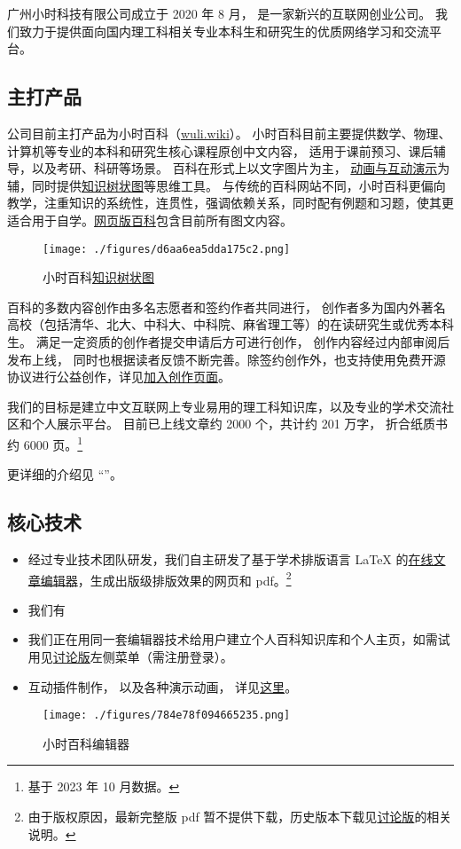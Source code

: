 
广州小时科技有限公司成立于 2020 年 8 月， 是一家新兴的互联网创业公司。 我们致力于提供面向国内理工科相关专业本科生和研究生的优质网络学习和交流平台。

\subsection{主打产品}
公司目前主打产品为小时百科（\href{https://wuli.wiki}{wuli.wiki}）。 小时百科目前主要提供数学、物理、计算机等专业的本科和研究生核心课程原创中文内容， 适用于课前预习、课后辅导，以及考研、科研等场景。 百科在形式上以文字图片为主， \href{https://wuli.wiki/apps/}{动画与互动演示}为辅，同时提供\href{https://wuli.wiki/tree/}{知识树状图}等思维工具。 与传统的百科网站不同，小时百科更偏向教学，注重知识的系统性，连贯性，强调依赖关系，同时配有例题和习题，使其更适合用于自学。\href{https://wuli.wiki/online/}{网页版百科}包含目前所有图文内容。

\begin{figure}[ht]
\centering
\texttt{[image: ./figures/d6aa6ea5dda175c2.png]}
\caption{小时百科\href{https://wuli.wiki/tree/}{知识树状图}} \label{fig_Compny_2}
\end{figure}

百科的多数内容创作由多名志愿者和签约作者共同进行， 创作者多为国内外著名高校（包括清华、北大、中科大、中科院、麻省理工等）的在读研究生或优秀本科生。 满足一定资质的创作者提交申请后方可进行创作， 创作内容经过内部审阅后发布上线， 同时也根据读者反馈不断完善。除签约创作外，也支持使用免费开源协议进行公益创作，详见\href{https://wuli.wiki/forum/f9ec7f8e-ca37-4278-a77e-ba5c0e40e115}{加入创作页面}。

我们的目标是建立中文互联网上专业易用的理工科知识库，以及专业的学术交流社区和个人展示平台。 目前已上线文章约 2000 个，共计约 201 万字， 折合纸质书约 6000 页。\footnote{基于 2023 年 10 月数据。}

更详细的介绍见 “”。

\subsection{核心技术}
\begin{itemize}
\item 经过专业技术团队研发，我们自主研发了基于学术排版语言 LaTeX 的\href{https://wuli.wiki/editor/}{在线文章编辑器}，生成出版级排版效果的网页和 pdf。\footnote{由于版权原因，最新完整版 pdf 暂不提供下载，历史版本下载见\href{https://wuli.wiki/forum/}{讨论版}的相关说明。}
\item 我们有
\item 我们正在用同一套编辑器技术给用户建立个人百科知识库和个人主页，如需试用见\href{https://wuli.wiki/forum/}{讨论版}左侧菜单（需注册登录）。
\item 互动插件制作， 以及各种演示动画， 详见\href{http://wuli.wiki/apps}{这里}。
\end{itemize}

\begin{figure}[ht]
\centering
\texttt{[image: ./figures/784e78f094665235.png]}
\caption{小时百科编辑器} \label{fig_Compny_1}
\end{figure}
